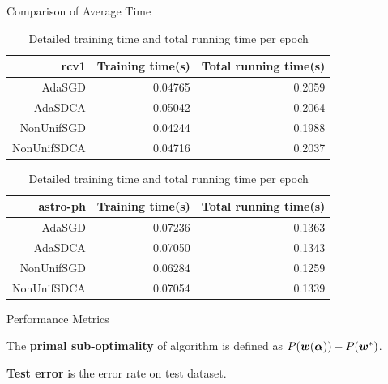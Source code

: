 \begin{frame}{Comparison of Average Time}
\begin{table}[htbp]
    \centering
    \caption{Detailed training time and total running time per epoch}
    \label{table:rcv1_time}
    \begin{tabular}{|r|r|r|}
        \hline 
        rcv1 & Training time(s) & Total running time(s) \\
        \hline
        AdaSGD & 0.04765 & 0.2059 \\
        \hline
        AdaSDCA & 0.05042 & 0.2064 \\
        \hline
        NonUnifSGD & 0.04244 & 0.1988 \\
        \hline
        NonUnifSDCA  & 0.04716 & 0.2037 \\
	\hline
    \end{tabular}
    \label{table:astro-ph_time}
    \begin{tabular}{|r|r|r|}
        \hline 
        astro-ph &  Training time(s) & Total running time(s) \\
        \hline
        AdaSGD & 0.07236 & 0.1363 \\
        \hline
        AdaSDCA & 0.07050 & 0.1343 \\
        \hline
        NonUnifSGD & 0.06284 & 0.1259 \\
        \hline
        NonUnifSDCA  & 0.07054 & 0.1339 \\
        \hline
    \end{tabular}
\end{table}
\end{frame}

\begin{frame}{Performance Metrics}
\begin{definition}\label{def:psds}
The \textbf{primal sub-optimality} of algorithm is defined as $P(\bm{w}(\bm{\alpha})) - P(\bm{w}^*)$. 
\end{definition}
\begin{definition}
\textbf{Test error} is the error rate on test dataset.
\end{definition}
\end{frame}

